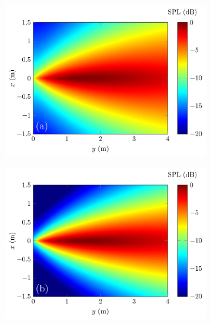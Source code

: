 \begin{figure}[!htb]
    \centering
    \begin{subfigure}{0.45\textwidth}
        \centering
        \includegraphics[width = \textwidth]{fig/Shi2015JasaFig4_Pal2D_PWE_Fullfield_Show_500Hz_v3_resize.jpg}
    \end{subfigure}
    \begin{subfigure}{0.45\textwidth}
        \centering
        \includegraphics[width = \textwidth]{fig/Shi2015JasaFig4_Pal2D_PWE_Fullfield_Show_1000Hz_v3_resize.jpg}
    \end{subfigure}
    \\
    \begin{subfigure}{0.45\textwidth}

\end{subfigure}
\end{figure}
